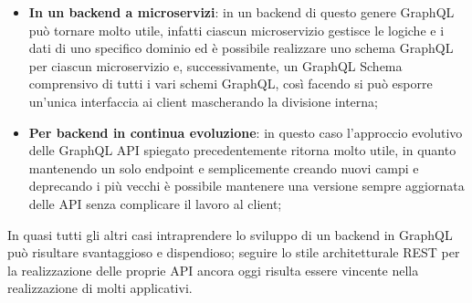 \begin{itemize}
  \item \textbf{In un backend a microservizi}: in un backend di questo genere GraphQL può tornare molto utile, infatti ciascun microservizio gestisce le logiche e i dati di uno specifico dominio ed è possibile realizzare uno schema GraphQL per ciascun microservizio e, successivamente, un GraphQL Schema comprensivo di tutti i vari schemi GraphQL, così facendo si può esporre un'unica interfaccia ai client mascherando la divisione interna;
  \item \textbf{Per backend in continua evoluzione}: in questo caso l'approccio evolutivo delle GraphQL API spiegato precedentemente ritorna molto utile, in quanto mantenendo un solo endpoint e semplicemente creando nuovi campi e deprecando i più vecchi è possibile mantenere una versione sempre aggiornata delle API senza complicare il lavoro al client;
\end{itemize}
In quasi tutti gli altri casi intraprendere lo sviluppo di un backend in GraphQL può risultare svantaggioso e dispendioso; seguire lo stile architetturale REST per la realizzazione delle proprie API ancora oggi risulta essere vincente nella realizzazione di molti applicativi.

